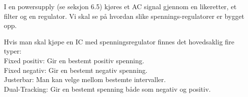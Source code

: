 I en powersupply (se seksjon 6.5) kjøres et AC signal gjennom en likeretter,
et filter og en regulator.
Vi skal se på hvordan slike spennings-regulatorer er bygget opp.

Hvis man skal kjøpe en IC med spenningsregulator finnes det hovedsaklig
fire typer:\\
Fixed positiv: Gir en bestemt positiv spenning.\\
Fixed negativ: Gir en bestemt negativ spenning.\\
Justerbar: Man kan velge mellom bestemte intervaller.\\
Dual-Tracking: Gir en bestemt spenning både som negativ og positiv.
